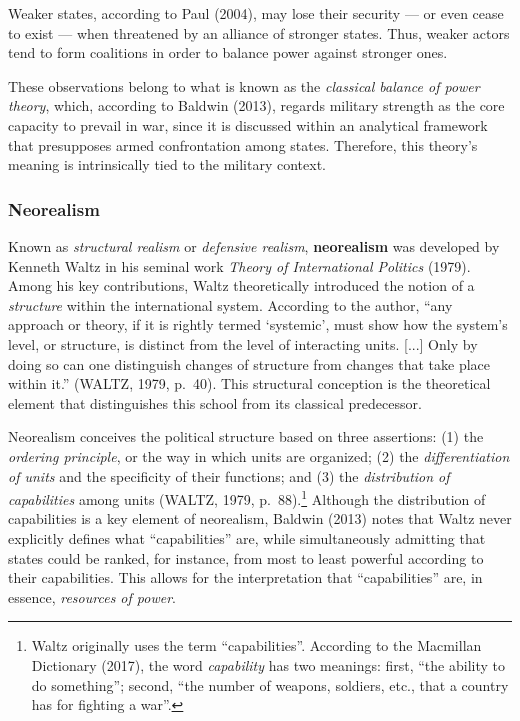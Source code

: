 Weaker states, according to Paul (2004), may lose their security --- or even cease to exist --- when threatened by an alliance of stronger states. Thus, weaker actors tend to form coalitions in order to balance power against stronger ones.

These observations belong to what is known as the \textit{classical balance of power theory}, which, according to Baldwin (2013), regards military strength as the core capacity to prevail in war, since it is discussed within an analytical framework that presupposes armed confrontation among states. Therefore, this theory’s meaning is intrinsically tied to the military context.


\subsubsection{Neorealism}

Known as \textit{structural realism} or \textit{defensive realism}, \textbf{neorealism} was developed by Kenneth Waltz in his seminal work \textit{Theory of International Politics} (1979). Among his key contributions, Waltz theoretically introduced the notion of a \textit{structure} within the international system. According to the author, ``any approach or theory, if it is rightly termed ‘systemic’, must show how the system's level, or structure, is distinct from the level of interacting units. [...] Only by doing so can one distinguish changes of structure from changes that take place within it.'' (WALTZ, 1979, p.~40). This structural conception is the theoretical element that distinguishes this school from its classical predecessor.

Neorealism conceives the political structure based on three assertions: (1) the \textit{ordering principle}, or the way in which units are organized; (2) the \textit{differentiation of units} and the specificity of their functions; and (3) the \textit{distribution of capabilities} among units (WALTZ, 1979, p.~88).\footnote{Waltz originally uses the term ``capabilities''. According to the Macmillan Dictionary (2017), the word \textit{capability} has two meanings: first, ``the ability to do something''; second, ``the number of weapons, soldiers, etc., that a country has for fighting a war''.} Although the distribution of capabilities is a key element of neorealism, Baldwin (2013) notes that Waltz never explicitly defines what “capabilities” are, while simultaneously admitting that states could be ranked, for instance, from most to least powerful according to their capabilities. This allows for the interpretation that “capabilities” are, in essence, \textit{resources of power}.


